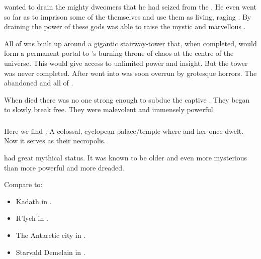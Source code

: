 \Sethicus wanted to drain the mighty dweomers that he had seized from the \shugul.
He even went so far as to imprison some of the \moongods themselves and use them as living, raging \dweomers. 
By draining the power of these gods \Sethicus was able to raise the mystic and marvellous \Baltherium. 

All of \Baltherium was built up around a gigantic stairway-tower that, when completed, would form a permanent portal to \RuinSatha's burning throne of chaos at the centre of the universe. 
This would give \Sethicus access to unlimited power and insight. 
But the tower was never completed. 
After \Sethicus went into  \Baltherium was soon overrun by grotesque horrors. 
The \dragons abandoned \Baltherium and all of \Nom.

When \Sethicus died there was no one strong enough to subdue the captive \moongods.
They began to slowly break free. 
They were malevolent and immensely powerful.





\subsubsection{\Baltherium}
\index{\Baltherium}
Here we find \Baltherium: 
A colossal, cyclopean palace/temple where \Tiamat{} and her \firstgendragons{} once dwelt. 
Now it serves as their necropolis. 

\Baltherium had great mythical status.
It was known to be older and even more mysterious than \dash more powerful and more dreaded.

Compare to:

\begin{itemize}
  \item Kadath in \cite{HPLovecraft:TheDreamQuestofUnknownKadath}.
  \item R'lyeh in \cite{HPLovecraft:TheCallofCthulhu}. 
  \item The Antarctic city in \cite{HPLovecraft:AttheMountainsofMadness}. 
  \item Starvald Demelain in \cite{StevenErikson:ReapersGale}. 
\end{itemize}


